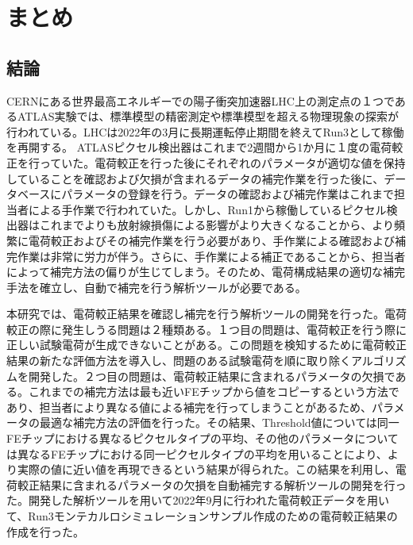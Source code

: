 \chapter{まとめ}
\label{sec:chap8}

\section{結論}
\label{sec:ketsuron}

CERNにある世界最高エネルギーでの陽子衝突加速器LHC上の測定点の１つであるATLAS実験では、標準模型の精密測定や標準模型を超える物理現象の探索が行われている。LHCは2022年の3月に長期運転停止期間を終えてRun3として稼働を再開する。
ATLASピクセル検出器はこれまで2週間から1か月に１度の電荷較正を行っていた。電荷較正を行った後にそれぞれのパラメータが適切な値を保持していることを確認および欠損が含まれるデータの補完作業を行った後に、データベースにパラメータの登録を行う。データの確認および補完作業はこれまで担当者による手作業で行われていた。しかし、Run1から稼働しているピクセル検出器はこれまでよりも放射線損傷による影響がより大きくなることから、より頻繁に電荷較正およびその補完作業を行う必要があり、手作業による確認および補完作業は非常に労力が伴う。さらに、手作業による補正であることから、担当者によって補完方法の偏りが生じてしまう。そのため、電荷構成結果の適切な補完手法を確立し、自動で補完を行う解析ツールが必要である。

本研究では、電荷較正結果を確認し補完を行う解析ツールの開発を行った。電荷較正の際に発生しうる問題は２種類ある。１つ目の問題は、電荷較正を行う際に正しい試験電荷が生成できないことがある。この問題を検知するために電荷較正結果の新たな評価方法を導入し、問題のある試験電荷を順に取り除くアルゴリズムを開発した。２つ目の問題は、電荷較正結果に含まれるパラメータの欠損である。これまでの補完方法は最も近いFEチップから値をコピーするという方法であり、担当者により異なる値による補完を行ってしまうことがあるため、パラメータの最適な補完方法の評価を行った。その結果、Threshold値については同一FEチップにおける異なるピクセルタイプの平均、その他のパラメータについては異なるFEチップにおける同一ピクセルタイプの平均を用いることにより、より実際の値に近い値を再現できるという結果が得られた。この結果を利用し、電荷較正結果に含まれるパラメータの欠損を自動補完する解析ツールの開発を行った。開発した解析ツールを用いて2022年9月に行われた電荷較正データを用いて、Run3モンテカルロシミュレーションサンプル作成のための電荷較正結果の作成を行った。

